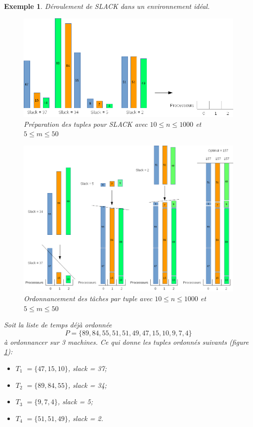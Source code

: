 \documentclass[a4paper,12pt]{report}
\theoremstyle{plain}				%
\newtheorem{example}{Exemple}
\theoremstyle{definition}				%
\newcommand{\jb}[1]{\todo[author=JB,color=orange,inline]{#1}}
\begin{document}
\begin{example}
Déroulement de SLACK dans un environnement idéal.

\begin{figure}
{\centering
\includegraphics[width=\columnwidth]{Slack_Non_Unif_Exemple_Ok1.png}
\caption{Préparation des tuples pour SLACK avec $10\leq n \leq 1000$ et $5\leq m \leq 50$}
\label{ex:SLACKOK1}
\par}
\end{figure}

\begin{figure}
{\centering
\includegraphics[width=\columnwidth]{Slack_Non_Unif_Exemple_Ok2.png}
\caption{Ordonnancement des tâches par tuple avec $10\leq n \leq 1000$ et $5\leq m \leq 50$}
\label{ex:SLACKOK2}
\par}
\end{figure}

Soit la liste de temps déjà ordonnée $$P = \{89, 84, 55, 51, 51, 49, 47, 15, 10, 9, 7, 4\}$$ à ordonnancer sur 3 machines. Ce qui donne les tuples ordonnés suivants (figure \ref{ex:SLACKOK1}):
\begin{itemize}
	\item $T_1$ $=\{47, 15, 10\}$, slack = 37;
	\item $T_2$ $=\{89, 84, 55\}$, slack = 34;
	\item $T_3$ $=\{9, 7, 4\}$, slack = 5;
	\item $T_4$ $=\{51, 51, 49\}$, slack = 2.
\end{itemize}


\end{example}
\end{document}
